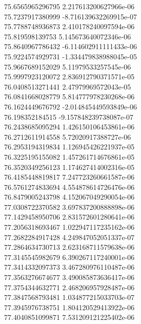 {75.6565965296795 2.217613200627966e-06 \\
75.7237917380999 -8.716139632269915e-07 \\
75.7788748936873 2.410178240097594e-06 \\
75.819598139753 5.145673640072346e-06 \\
75.8640967786432 -6.114602911111433e-06 \\
75.9224574929731 -1.334479838988045e-05 \\
75.9667689152029 5.11979533257545e-06 \\
75.9997923120072 2.836912790371571e-05 \\
76.0408513271441 2.47979969572043e-05 \\
76.0841668028779 5.814777978230268e-06 \\
76.1624449676792 -2.014845449593849e-06 \\
76.198352184515 -9.157848239738087e-07 \\
76.2438685095294 1.426150106453861e-06 \\
76.2712611914558 5.72020917388727e-06 \\
76.2953194319834 1.126945426221937e-05 \\
76.3225195155082 1.457261714676861e-05 \\
76.3520349256123 1.174627414002316e-05 \\
76.4185448819817 7.247723260661587e-06 \\
76.5761274833694 4.554878614726476e-06 \\
76.8479005243798 4.152067049290054e-06 \\
77.0308722370582 3.697837200888898e-06 \\
77.1429458950706 2.831572601280641e-06 \\
77.2056318693467 1.022947117235162e-06 \\
77.2682284917428 4.249847052051337e-07 \\
77.2864634730713 2.623168711579638e-06 \\
77.3145545982679 6.390267117240001e-06 \\
77.3414332097373 3.467280976110487e-06 \\
77.3563276674677 3.490085873636417e-06 \\
77.3754344632771 2.468206957928487e-06 \\
77.3847568793481 1.034877215033703e-07 \\
77.3945976738751 1.804120529413922e-06 \\
77.4040851099871 7.531209121225402e-06 \\
}
